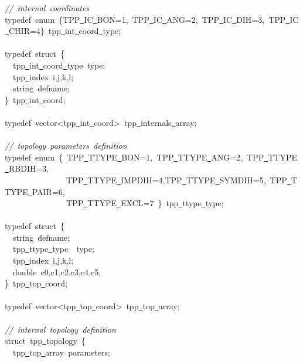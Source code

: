 \documentclass[a4paper,10pt]{article}
\begin{document}
{\textsl{//\ internal\ coordinates}\\
typedef\ enum\ \{TPP\underline\ IC\underline\ BON=1,\ TPP\underline\ IC\underline\ ANG=2,\ TPP\underline\ IC\underline\ DIH=3,\ TPP\underline\ IC\underline\ CHIR=4\}\ tpp\underline\ int\underline\ coord\underline\ type;\\
\ \\
typedef\ struct\ \{\ \\
\ \ tpp\underline\ int\underline\ coord\underline\ type\ type;\\
\ \ tpp\underline\ index\ i,j,k,l;\\
\ \ string\ defname;\\
\}\ tpp\underline\ int\underline\ coord;\\
\ \\
typedef\ vector<{}tpp\underline\ int\underline\ coord>{}\ tpp\underline\ internals\underline\ array;\\
\ \\
\textsl{//\ topology\ parameters\ definition}\\
typedef\ enum\ \{\ TPP\underline\ TTYPE\underline\ BON=1,\ TPP\underline\ TTYPE\underline\ ANG=2,\ TPP\underline\ TTYPE\underline\ RBDIH=3,\ \\
\ \ \ \ \ \ \ \ \ \ \ \ \ \ \ TPP\underline\ TTYPE\underline\ IMPDIH=4,TPP\underline\ TTYPE\underline\ SYMDIH=5,\ TPP\underline\ TTYPE\underline\ PAIR=6,\\
\ \ \ \ \ \ \ \ \ \ \ \ \ \ \ TPP\underline\ TTYPE\underline\ EXCL=7\ \}\ tpp\underline\ ttype\underline\ type;\\
\ \\
typedef\ struct\ \{\\
\ \ string\ defname;\\
\ \ tpp\underline\ ttype\underline\ type\ \ type;\\
\ \ tpp\underline\ index\ i,j,k,l;\ \ \\
\ \ double\ c0,c1,c2,c3,c4,c5;\\
\}\ tpp\underline\ top\underline\ coord;\\
\ \\
typedef\ vector<{}tpp\underline\ top\underline\ coord>{}\ tpp\underline\ top\underline\ array;\\
\ \\
\textsl{//\ internal\ topology\ definition}\\
struct\ tpp\underline\ topology\ \{\\
\ \ tpp\underline\ top\underline\ array\ parameters;\\
}
\end{document}
